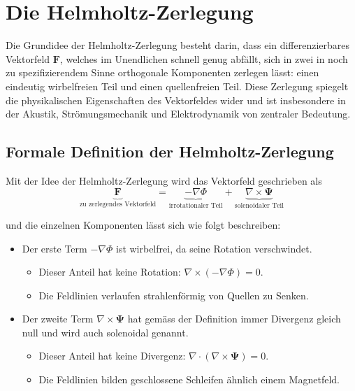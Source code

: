 %
%
%
%
\section{Die Helmholtz-Zerlegung
\label{helmholtz:section:Helmholtz_Zerlegung}}

Die Grundidee der Helmholtz-Zerlegung besteht darin, dass ein differenzierbares  Vektorfeld $\mathbf{F}$, welches im Unendlichen schnell genug abfällt, sich in zwei in noch zu spezifizierendem Sinne orthogonale Komponenten zerlegen lässt: einen eindeutig wirbelfreien Teil und einen quellenfreien Teil. Diese Zerlegung spiegelt die physikalischen Eigenschaften des Vektorfeldes wider und ist insbesondere in der Akustik, Strömungsmechanik und Elektrodynamik von zentraler Bedeutung.

\subsection{Formale Definition der Helmholtz-Zerlegung
\label{helmholtz:subsection:def_Helmholtz_Zerlegung}}

Mit der Idee der Helmholtz-Zerlegung wird das Vektorfeld geschrieben als
\begin{equation}
\underbrace{\mathbf{F}}_{\text{zu zerlegendes Vektorfeld}} = \underbrace{-\nabla \Phi}_{\text{irrotationaler Teil}} + \underbrace{\nabla \times \mathbf{\Psi}}_{\text{solenoidaler Teil}} 
\label{helmholtz:equationAllgemein}
\end{equation}

\noindent und die einzelnen Komponenten lässt sich wie folgt beschreiben:

\begin{itemize}
\item Der erste Term $ -\nabla \Phi $ ist wirbelfrei, da seine Rotation verschwindet.
\begin{itemize}
\item Dieser Anteil hat keine Rotation: $\nabla \times (-\nabla \Phi) = 0$.
\item Die Feldlinien verlaufen strahlenförmig von Quellen zu Senken.
\end{itemize}

\item Der zweite Term $\nabla \times \mathbf{\Psi}$ hat gemäss der Definition immer Divergenz gleich null und wird auch solenoidal genannt.
\begin{itemize}
\item Dieser Anteil hat keine Divergenz: $\nabla \cdot (\nabla \times \mathbf{\Psi}) = 0$.
\item Die Feldlinien bilden geschlossene Schleifen ähnlich einem Magnetfeld.
\end{itemize}
\end{itemize}


